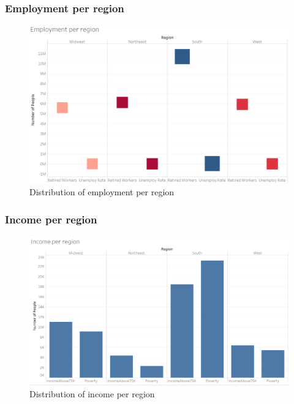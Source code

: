\documentclass[11pt]{article}
\begin{document}
\subsubsection{Employment per region}
\begin{figure}[H]
    \centering
    \includegraphics[width=0.90\columnwidth]{assets/employment_region.PNG}
    \caption{Distribution of employment per region }
    \label{lr}
\end{figure}

\subsubsection{Income per region}
\begin{figure}[H]
    \centering
    \includegraphics[width=0.90\columnwidth]{assets/income_region.PNG}
    \caption{Distribution of income per region }
    \label{lr}
\end{figure}
\end{document}
